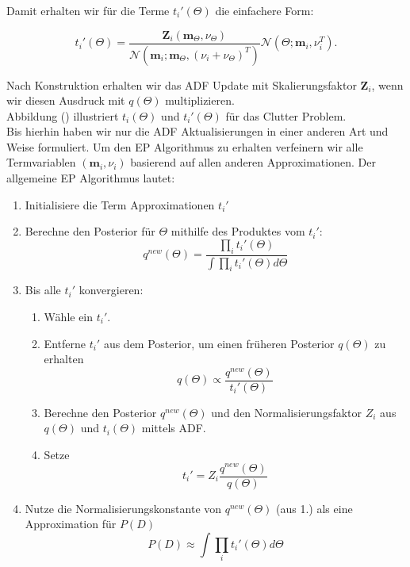 \documentclass[12pt,a4paper]{scrartcl}
\numberwithin{equation}{section}
\begin{document}
{  Damit erhalten wir für die Terme $t_i'(\Theta)$ die einfachere Form: 
  
  \begin{equation}
   t_i'(\Theta) = \frac{\mathbf{Z}_i(\mathbf{m}_{\Theta}, \nu_{\Theta})}{\mathcal{N}(\mathbf{m}_i; \mathbf{m}_{\Theta}, (\nu_i + \nu_{\Theta})^T)} \mathcal{N}(\Theta; \mathbf{m}_i, \nu_i^T).
  \end{equation}

  Nach Konstruktion erhalten wir das ADF Update mit Skalierungsfaktor $\mathbf{Z}_i$, wenn wir diesen Ausdruck mit 
  $q(\Theta)$ multiplizieren. \\
  Abbildung () illustriert $t_i(\Theta)$ und $t_i'(\Theta)$ für das Clutter Problem. \\
  
  Bis hierhin haben wir nur die ADF Aktualisierungen in einer anderen Art und Weise formuliert. 
  Um den EP Algorithmus zu erhalten verfeinern wir alle Termvariablen $(\mathbf{m}_i, \nu_i)$ basierend auf allen anderen Approximationen. 
  Der allgemeine EP Algorithmus lautet: 
  
  \begin{enumerate}
   \item Initialisiere die Term Approximationen $t_i'$
   \item Berechne den Posterior für $\Theta$ mithilfe des Produktes vom $t_i'$:
   \begin{equation}
    q^{new}(\Theta) = \frac{\prod_i t_i'(\Theta)}{\int \prod_i t_i'(\Theta) d \Theta}
   \end{equation}
   \item Bis alle $t_i'$ konvergieren: 
   \begin{enumerate}
    \item Wähle ein $t_i'$.
    \item Entferne $t_i'$ aus dem Posterior, um einen früheren Posterior $q(\Theta)$ zu erhalten
    \begin{equation}
     q(\Theta) \propto \frac{q^{new}(\Theta)}{t_i'(\Theta)}
    \end{equation}
    \item Berechne den Posterior $q^{new}(\Theta)$ und den Normalisierungsfaktor $Z_i$ aus $q(\Theta)$ 
    und $t_i(\Theta)$ mittels ADF.
    \item Setze 
    \begin{equation}
     t_i' = Z_i \frac{q^{new}(\Theta)}{q(\Theta)}
    \end{equation}
   \end{enumerate}
   \item Nutze die Normalisierungskonstante von $q^{new}(\Theta)$ (aus 1.) als eine Approximation für $P(D)$
   \begin{equation}
    P(D) \approx \int \prod_i t_i'(\Theta) d \Theta
   \end{equation}
  \end{enumerate}

}
\end{document}
